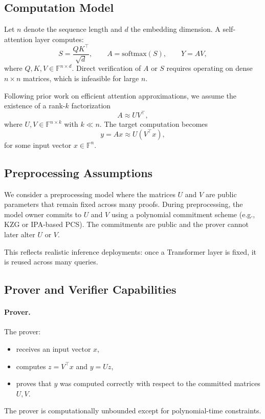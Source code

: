 \documentclass[11pt]{article}
\begin{document}
\subsection{Computation Model}

Let $n$ denote the sequence length and $d$ the embedding dimension.
A self-attention layer computes:
\[
  S = \frac{QK^\top}{\sqrt{d}}, \qquad
  A = \mathrm{softmax}(S), \qquad
  Y = A V,
\]
where $Q, K, V \in \mathbb{F}^{n \times d}$.
Direct verification of $A$ or $S$ requires operating on dense
$n \times n$ matrices, which is infeasible for large $n$.

Following prior work on efficient attention approximations, we assume the
existence of a rank-$k$ factorization
\[
  A \approx U V^\top,
\]
where $U, V \in \mathbb{F}^{n \times k}$ with $k \ll n$.
The target computation becomes
\[
  y = A x \approx U(V^\top x),
\]
for some input vector $x \in \mathbb{F}^n$.

\subsection{Preprocessing Assumptions}

We consider a preprocessing model where the matrices $U$ and $V$ are
public parameters that remain fixed across many proofs.
During preprocessing, the model owner commits to $U$ and $V$ using a
polynomial commitment scheme (e.g., KZG or IPA-based PCS).
The commitments are public and the prover cannot later alter $U$ or $V$.

This reflects realistic inference deployments: once a Transformer layer
is fixed, it is reused across many queries.

\subsection{Prover and Verifier Capabilities}

\paragraph{Prover.}
The prover:
\begin{itemize}
  \item receives an input vector $x$,
  \item computes $z = V^\top x$ and $y = U z$,
  \item proves that $y$ was computed correctly with respect to the
        committed matrices $U, V$.
\end{itemize}
The prover is computationally unbounded except for polynomial-time
constraints.
\end{document}
